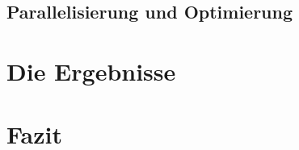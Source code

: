 \documentclass[12pt,a4paper]{article}
\begin{document}
\subsection{Parallelisierung und Optimierung}

\section{Die Ergebnisse}

\section{Fazit}
\end{document}
